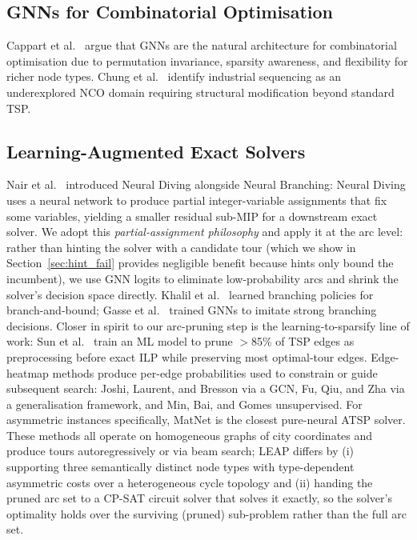 \documentclass[review,times]{elsarticle}
\begin{document}
\subsection{GNNs for Combinatorial Optimisation}

Cappart et al.\ \cite{cappart2023gnnco} argue that GNNs are the natural architecture for combinatorial optimisation due to permutation invariance, sparsity awareness, and flexibility for richer node types. Chung et al.\ \cite{chung2025ncosurvey} identify industrial sequencing as an underexplored NCO domain requiring structural modification beyond standard TSP.

\subsection{Learning-Augmented Exact Solvers}

Nair et al.\ \cite{nair2021neural} introduced Neural Diving alongside Neural Branching: Neural Diving uses a neural network to produce partial integer-variable assignments that fix some variables, yielding a smaller residual sub-MIP for a downstream exact solver. We adopt this \emph{partial-assignment philosophy} and apply it at the arc level: rather than hinting the solver with a candidate tour (which we show in Section~\ref{sec:hint_fail} provides negligible benefit because hints only bound the incumbent), we use GNN logits to eliminate low-probability arcs and shrink the solver's decision space directly. Khalil et al.\ \cite{khalil2016learning} learned branching policies for branch-and-bound; Gasse et al.\ \cite{gasse2019exact} trained GNNs to imitate strong branching decisions. Closer in spirit to our arc-pruning step is the learning-to-sparsify line of work: Sun et al.\ \cite{sun2021sparsify} train an ML model to prune $>$85\% of TSP edges as preprocessing before exact ILP while preserving most optimal-tour edges. Edge-heatmap methods produce per-edge probabilities used to constrain or guide subsequent search: Joshi, Laurent, and Bresson \cite{joshi2019gcntsp} via a GCN, Fu, Qiu, and Zha \cite{fu2021gentsp} via a generalisation framework, and Min, Bai, and Gomes \cite{min2023utsp} unsupervised. For asymmetric instances specifically, MatNet \cite{kwon2021matnet} is the closest pure-neural ATSP solver. These methods all operate on homogeneous graphs of city coordinates and produce tours autoregressively or via beam search; LEAP differs by (i) supporting three semantically distinct node types with type-dependent asymmetric costs over a heterogeneous cycle topology and (ii) handing the pruned arc set to a CP-SAT circuit solver that solves it exactly, so the solver's optimality holds over the surviving (pruned) sub-problem rather than the full arc set.
\end{document}
